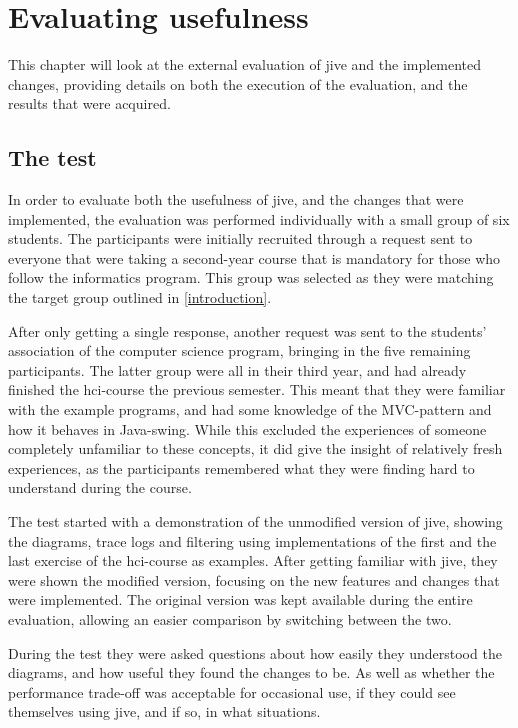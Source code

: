 \chapter{Evaluating usefulness}\label{jiveEval}

This chapter will look at the external evaluation of \gls{jive} and the implemented changes, providing details on both the execution of the evaluation, and the results that were acquired.

\section{The test}\label{jiveEvalTest}
In order to evaluate both the usefulness of \gls{jive}, and the changes that were implemented, the evaluation was performed individually with a small group of six students.
The participants were initially recruited through a request sent to everyone that were taking a second-year course that is mandatory for those who follow the informatics program.
This group was selected as they were matching the target group outlined in \cref{introduction}.

After only getting a single response, another request was sent to the students' association of the computer science program, bringing in the five remaining participants.
The latter group were all in their third year, and had already finished the \gls{hci}-course the previous semester.
This meant that they were familiar with the example programs, and had some knowledge of the MVC-pattern and how it behaves in Java-swing.
While this excluded the experiences of someone completely unfamiliar to these concepts, it did give the insight of relatively fresh experiences, as the participants remembered what they were finding hard to understand during the course.

The test started with a demonstration of the unmodified version of \gls{jive}, showing the diagrams, trace logs and filtering using implementations of the first and the last exercise of the \gls{hci}-course as examples.
After getting familiar with \gls{jive}, they were shown the modified version, focusing on the new features and changes that were implemented.
The original version was kept available during the entire evaluation, allowing an easier comparison by switching between the two.

During the test they were asked questions about how easily they understood the diagrams, and how useful they found the changes to be.
As well as whether the performance trade-off was acceptable for occasional use, if they could see themselves using \gls{jive}, and if so, in what situations.

